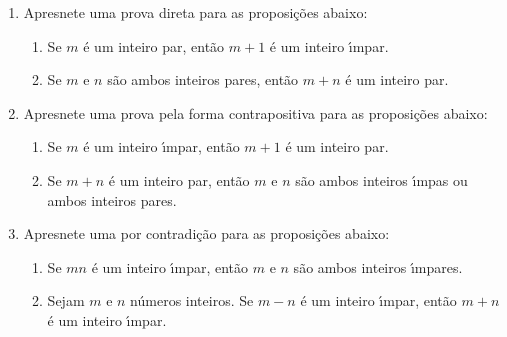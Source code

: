 \documentclass[a4paper,5pt]{amsbook}
\begin{document}
\begin{enumerate}
    \vspace{0.5cm}
    \item Apresnete uma prova direta para as proposi\c{c}\~oes abaixo:
        \begin{enumerate}
            \item Se $m$ \'e um inteiro par, ent\~ao $m+1$ \'e um inteiro \'{\i}mpar.
            \item Se $m$ e $n$ s\~ao ambos inteiros pares, ent\~ao $m+n$ \'e um
            inteiro par.
        \end{enumerate}

    \vspace{0.5cm}
    \item Apresnete uma prova pela forma contrapositiva para as proposi\c{c}\~oes abaixo:
        \begin{enumerate}
            \item Se $m$ \'e um inteiro \'{\i}mpar, ent\~ao $m+1$ \'e um inteiro par.
            \item Se $m+n$ \'e um inteiro par, ent\~ao $m$ e $n$ s\~ao ambos
            inteiros \'{\i}mpas ou ambos inteiros pares.
        \end{enumerate}

    \vspace{0.5cm}
    \item Apresnete uma por contradi\c{c}\~ao para as proposi\c{c}\~oes abaixo:
        \begin{enumerate}
            \item Se $mn$ \'e um inteiro \'{\i}mpar, ent\~ao $m$ e $n$ s\~ao ambos
            inteiros \'{\i}mpares.
            \item Sejam $m$ e $n$ n\'umeros inteiros. Se $m-n$ \'e um
            inteiro \'{\i}mpar, ent\~ao $m+n$ \'e um inteiro \'{\i}mpar.
        \end{enumerate}
\end{enumerate}
\end{document}
